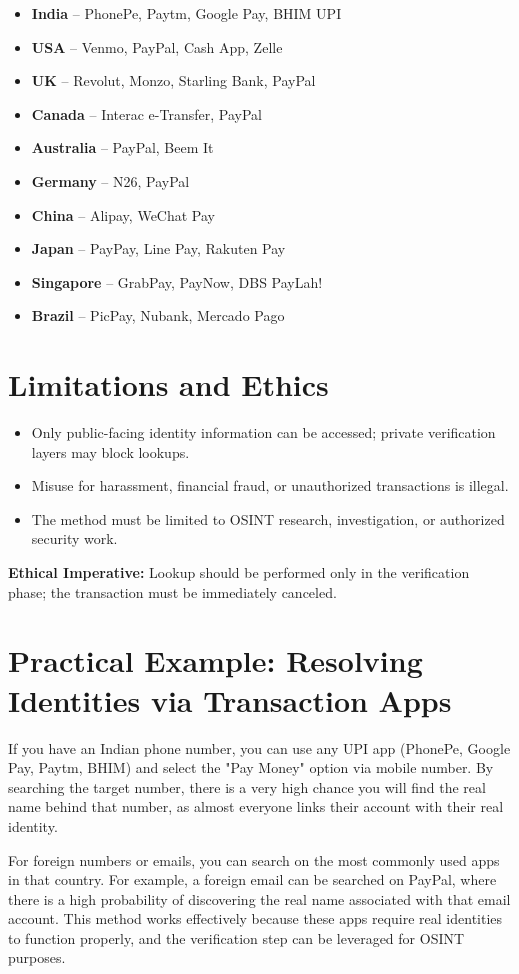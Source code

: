 \documentclass[12pt]{article}
\begin{document}
\begin{itemize}
    \item \textbf{India} – PhonePe, Paytm, Google Pay, BHIM UPI
    \item \textbf{USA} – Venmo, PayPal, Cash App, Zelle
    \item \textbf{UK} – Revolut, Monzo, Starling Bank, PayPal
    \item \textbf{Canada} – Interac e-Transfer, PayPal
    \item \textbf{Australia} – PayPal, Beem It
    \item \textbf{Germany} – N26, PayPal
    \item \textbf{China} – Alipay, WeChat Pay
    \item \textbf{Japan} – PayPay, Line Pay, Rakuten Pay
    \item \textbf{Singapore} – GrabPay, PayNow, DBS PayLah!
    \item \textbf{Brazil} – PicPay, Nubank, Mercado Pago
\end{itemize}

\section{Limitations and Ethics}

\begin{itemize}
    \item Only public-facing identity information can be accessed; private verification layers may block lookups.
    \item Misuse for harassment, financial fraud, or unauthorized transactions is illegal.
    \item The method must be limited to OSINT research, investigation, or authorized security work.
\end{itemize}

\textbf{Ethical Imperative:} Lookup should be performed only in the verification phase; the transaction must be immediately canceled.

\section{Practical Example: Resolving Identities via Transaction Apps}

If you have an Indian phone number, you can use any UPI app (PhonePe, Google Pay, Paytm, BHIM) and select the "Pay Money" option via mobile number. By searching the target number, there is a very high chance you will find the real name behind that number, as almost everyone links their account with their real identity.

For foreign numbers or emails, you can search on the most commonly used apps in that country. For example, a foreign email can be searched on PayPal, where there is a high probability of discovering the real name associated with that email account. This method works effectively because these apps require real identities to function properly, and the verification step can be leveraged for OSINT purposes.
\end{document}
